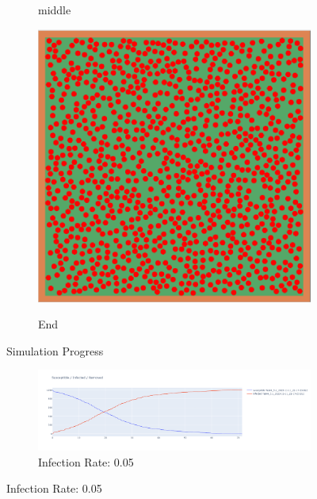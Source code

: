 \begin{figure}[H]
\begin{subfigure}{0.3\textwidth}
    \label{fig:mid}
    \caption{middle}
\end{subfigure}
   \begin{subfigure}{0.3\textwidth}
\includegraphics[width=\textwidth]{images/task4.5_end.png}
    \label{fig:end}
    \caption{End}
\end{subfigure}
    \caption{Simulation Progress}
    \label{fig:task4.5_1}
\end{figure}

\begin{figure}[H]
    \centering
   \begin{subfigure}{\textwidth}
\includegraphics[width=\textwidth]{images/task4.5_1_simulation.png}
 \caption{Infection Rate: 0.05}
    \label{fig:task4.5_1_visualization}
\end{subfigure}
\end{figure}

